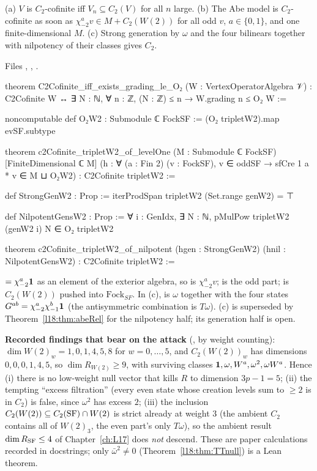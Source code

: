 \begin{theorem}\label{l18:thm:abeDirect}
(a) $V$ is $C_2$-cofinite iff $V_n\subseteq C_2(V)$ for all $n$ large. (b) The Abe model is $C_2$-cofinite as soon
as $\chi^a_{-2}v\in M+C_2(W(2))$ for all odd $v$, $a\in\{0,1\}$, and one finite-dimensional $M$. (c) Strong
generation by $\omega$ and the four bilinears together with nilpotency of their classes gives $C_2$.
\end{theorem}
\noindent Files ,
, .
\begin{leancode}
theorem C2Cofinite_iff_exists_grading_le_O₂ (W : VertexOperatorAlgebra 𝒱) :
    C2Cofinite W ↔ ∃ N : ℕ, ∀ n : ℤ, (N : ℤ) ≤ n → W.grading n ≤ O₂ W :=

noncomputable def O₂W2 : Submodule ℂ FockSF := (O₂ tripletW2).map evSF.subtype

theorem c2Cofinite_tripletW2_of_levelOne (M : Submodule ℂ FockSF) [FiniteDimensional ℂ M]
    (h : ∀ (a : Fin 2) (v : FockSF), v ∈ oddSF → sfCre 1 a * v ∈ M ⊔ O₂W2) :
    C2Cofinite tripletW2 :=

def StrongGenW2 : Prop := iterProdSpan tripletW2 (Set.range genW2) = ⊤

def NilpotentGensW2 : Prop :=
  ∀ i : GenIdx, ∃ N : ℕ, pMulPow tripletW2 (genW2 i) N ∈ O₂ tripletW2

theorem c2Cofinite_tripletW2_of_nilpotent (hgen : StrongGenW2) (hnil : NilpotentGensW2) :
    C2Cofinite tripletW2 :=
\end{leancode}
\begin{dictionary}
 $=\chi^a_{-2}\mathbf{1}$ as an element of the exterior algebra, so  is
$\chi^a_{-2}v$;  is the odd part;  is $C_2(W(2))$ pushed into $\mathrm{Fock}_{SF}$. In (c),
 is $\omega$ together with the four states $G^{ab}=\chi^a_{-2}\chi^b_{-1}\mathbf{1}$ (the antisymmetric
combination is $T\omega$). (c) is superseded by Theorem~\ref{l18:thm:abeRel} for the nilpotency half; its
generation half  is open.
\end{dictionary}
\begin{warning}
\textbf{Recorded findings that bear on the attack} (, by weight counting):
$\dim W(2)_w=1,0,1,4,5,8$ for $w=0,\dots,5$, and $C_2(W(2))_w$ has dimensions $0,0,0,1,4,5$, so
$\dim R_{W(2)}\ge9$, with surviving classes $\mathbf{1},\omega,W^a,\omega^2,\omega W^a$. Hence (i) there is no
low-weight null vector that kills $R$ to dimension $3p-1=5$; (ii) the tempting ``excess filtration'' (every even
state whose creation levels sum to $\ge2$ is in $C_2$) is false, since $\omega^2$ has excess $2$; (iii) the
inclusion $C_2(W(2))\subseteq C_2(\mathrm{SF})\cap W(2)$ is strict already at weight $3$ (the ambient $C_2$
contains all of $W(2)_3$, the even part's only $T\omega$), so the ambient result $\dim R_{\mathrm{SF}}\le4$ of
Chapter~\ref{ch:L17} does \emph{not} descend. These are paper calculations recorded in docstrings; only
$\bar\omega^2\ne0$ (Theorem~\ref{l18:thm:TTnull}) is a Lean theorem.
\end{warning}
